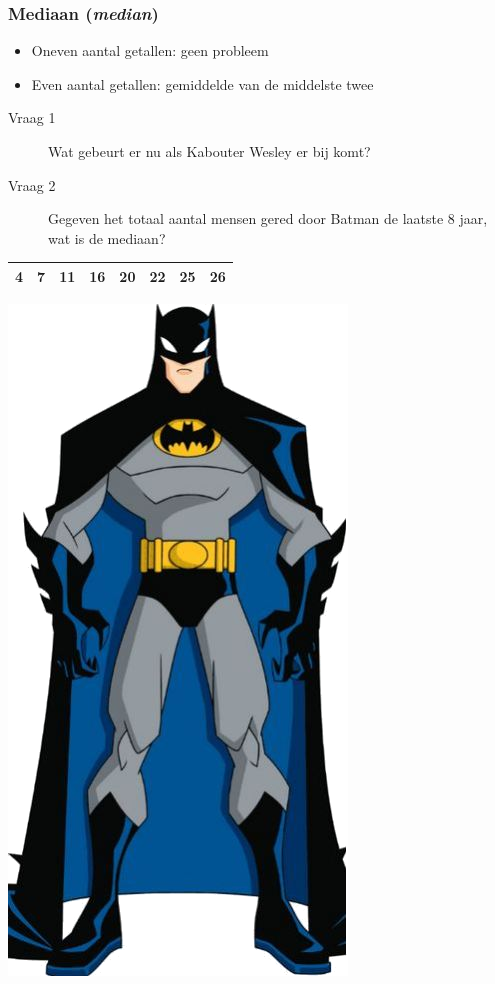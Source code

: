 \documentclass{beamer}
\begin{document}
\begin{frame}
  \frametitle{Mediaan (\emph{median})}


  \begin{itemize}
    \item Oneven aantal getallen: geen probleem
    \item Even aantal getallen: gemiddelde van de middelste twee
  \end{itemize}

  

  \pause

  \begin{description}
    \item[Vraag 1] Wat gebeurt er nu als Kabouter Wesley er bij komt?
    \item[Vraag 2] Gegeven het totaal aantal mensen gered door Batman de laatste 8 jaar, wat is de mediaan?
  \end{description}

    \centering
    \begin{tabular}{|c|c|c|c|c|c|c|c|}
      \hline
      4 & 7 & 11 & 16 & 20 & 22 & 25 & 26 \\
      \hline
    \end{tabular}
    \includegraphics[width=.6cm]{img/les2-hero-2}
\end{frame}
\end{document}
